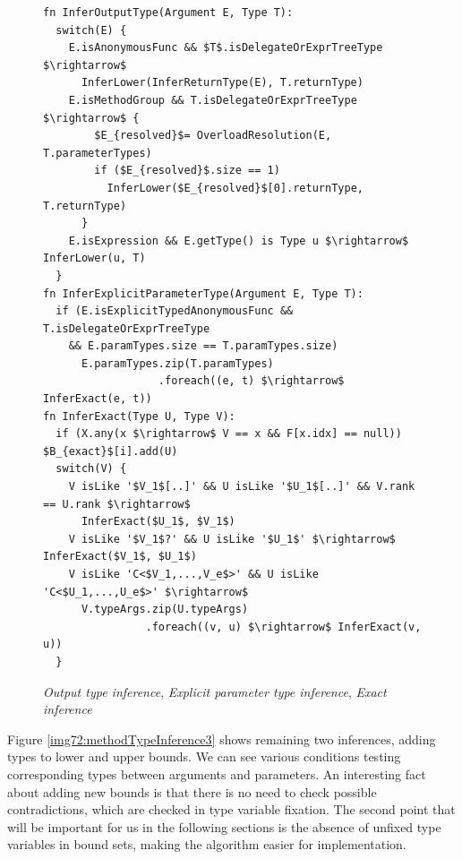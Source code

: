 \par
\begin{figure}
\begin{lstlisting}[style=myAlgo, mathescape=true]
fn InferOutputType(Argument E, Type T):
  switch(E) {
	E.isAnonymousFunc && $T$.isDelegateOrExprTreeType $\rightarrow$
	  InferLower(InferReturnType(E), T.returnType) 
	E.isMethodGroup && T.isDelegateOrExprTreeType $\rightarrow$ {
	  	$E_{resolved}$= OverloadResolution(E, T.parameterTypes)
	  	if ($E_{resolved}$.size == 1) 
	  	  InferLower($E_{resolved}$[0].returnType, T.returnType) 
	  }
	E.isExpression && E.getType() is Type u $\rightarrow$ InferLower(u, T)
  }
fn InferExplicitParameterType(Argument E, Type T):
  if (E.isExplicitTypedAnonymousFunc && T.isDelegateOrExprTreeType
    && E.paramTypes.size == T.paramTypes.size)
      E.paramTypes.zip(T.paramTypes)
                  .foreach((e, t) $\rightarrow$ InferExact(e, t))
fn InferExact(Type U, Type V):
  if (X.any(x $\rightarrow$ V == x && F[x.idx] == null)) $B_{exact}$[i].add(U)
  switch(V) {
    V isLike '$V_1$[..]' && U isLike '$U_1$[..]' && V.rank == U.rank $\rightarrow$ 
      InferExact($U_1$, $V_1$)
    V isLike '$V_1$?' && U isLike '$U_1$' $\rightarrow$ InferExact($V_1$, $U_1$)
    V isLike 'C<$V_1,...,V_e$>' && U isLike 'C<$U_1,...,U_e$>' $\rightarrow$
      V.typeArgs.zip(U.typeArgs)
                .foreach((v, u) $\rightarrow$ InferExact(v, u)) 
  }
\end{lstlisting}
\caption{\textit{Output type inference}, \textit{Explicit parameter type inference}, \textit{Exact inference}}
\label{img71:methodTypeInference2}
\end{figure}
\par
{}
Figure \ref{img72:methodTypeInference3} shows remaining two inferences, adding types to lower and upper bounds.
We can see various conditions testing corresponding types between arguments and parameters. 
An interesting fact about adding new bounds is that there is no need to check possible contradictions, which are checked in type variable fixation. 
The second point that will be important for us in the following sections is the absence of unfixed type variables in bound sets, making the algorithm easier for implementation.
\par
